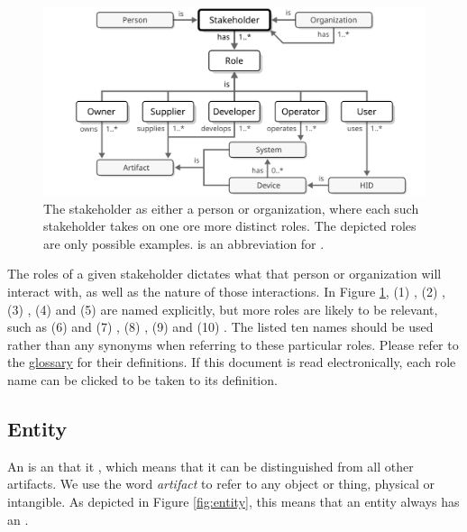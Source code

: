 \vfill

\begin{figure}[ht!]
  \centering
  \includegraphics[scale=0.9]{figures/stakeholder}
  \caption{
    The stakeholder as either a person or organization, where each such stakeholder takes on one ore more distinct roles.
    The depicted roles are only possible examples.
     is an abbreviation for .
  }
  \label{fig:stakeholder}
\end{figure}

The roles of a given stakeholder dictates what  that person or organization will interact with, as well as the nature of those interactions.
In Figure \ref{fig:stakeholder}, (1) , (2) , (3) , (4)  and (5)  are named explicitly, but more roles are likely to be relevant, such as (6)  and (7) , (8) , (9)  and (10) .
The listed ten names should be used rather than any synonyms when referring to these particular roles.
Please refer to the \hyperref[sec:glossary]{glossary} for their definitions.
If this document is read electronically, each role name can be clicked to be taken to its definition.

\subsection{Entity}
\label{sec:concepts:entity}

An  is an  that it , which means that it can be distinguished from all other artifacts.
We use the word \textit{artifact} to refer to any object or thing, physical or intangible.
As depicted in Figure \ref{fig:entity}, this means that an entity always has an .

